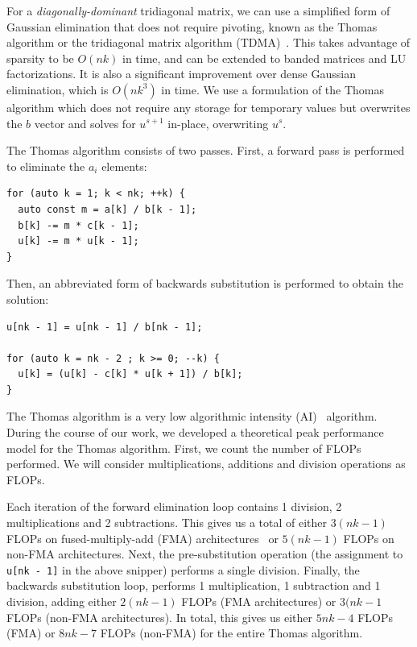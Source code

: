 \documentclass{sig-alternate-05-2015}
\begin{document}
For a \emph{diagonally-dominant} tridiagonal matrix, we can use a simplified
  form of Gaussian elimination that does not require pivoting, known as the
  Thomas algorithm or the tridiagonal matrix algorithm
  (TDMA)~\cite{ConteEtAlElementaryNumericalAnalysis,QuarteroniEtAl2007,TDMA}. 
This takes advantage of sparsity to be \(O(nk)\) in time, 
  and can be extended to banded matrices and LU factorizations.
It is also a significant improvement over dense Gaussian elimination,
  which is \(O(nk^3)\) in time. 
We use a formulation of the Thomas algorithm which does not require any storage
  for temporary values but overwrites the \(b\) vector and solves for \(u^{s+1}\)
  in-place, overwriting \(u^{s}\).

The Thomas algorithm consists of two passes.  First, a forward pass is
  performed to eliminate the \(a_i\) elements:
\begin{lstlisting}
for (auto k = 1; k < nk; ++k) {
  auto const m = a[k] / b[k - 1];
  b[k] -= m * c[k - 1];
  u[k] -= m * u[k - 1];
} 
\end{lstlisting}
Then, an abbreviated form of backwards substitution is performed to obtain the
  solution:
\begin{lstlisting}
u[nk - 1] = u[nk - 1] / b[nk - 1];

for (auto k = nk - 2 ; k >= 0; --k) {
  u[k] = (u[k] - c[k] * u[k + 1]) / b[k];
} 
\end{lstlisting}

The Thomas algorithm is a very low algorithmic intensity (AI)~\cite{roofline}
  algorithm.
During the course of our work, we developed a theoretical peak performance
  model for the Thomas algorithm.
First, we count the number of FLOPs performed.
We will consider multiplications, additions and division operations as FLOPs.

Each iteration of the forward elimination loop contains 1 division, 2
  multiplications and 2 subtractions.
This gives us a total of either \(3(nk-1)\) FLOPs on fused-multiply-add (FMA)
  architectures~\cite{} or \(5(nk-1)\) FLOPs on non-FMA architectures.
Next, the pre-substitution operation (the assignment to \lstinline{u[nk - 1]}
  in the above snipper) performs a single division.
Finally, the backwards substitution loop, performs 1 multiplication, 1
  subtraction and 1 division, adding either \(2(nk-1)\) FLOPs (FMA architectures)
  or \(3(nk-1\) FLOPs (non-FMA architectures).
In total, this gives us either \(5nk-4\) FLOPs (FMA) or \(8nk-7\) FLOPs
  (non-FMA) for the entire Thomas algorithm.
\end{document}
